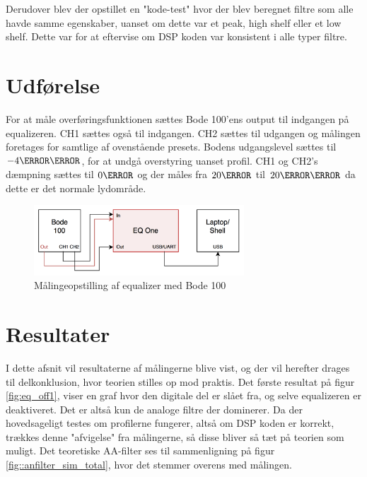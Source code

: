Derudover blev der opstillet en "kode-test" hvor der blev beregnet filtre som alle havde samme egenskaber, uanset om dette var et peak, high shelf eller et low shelf. Dette var for at eftervise om DSP koden var konsistent i alle typer filtre. \\

\section{Udførelse}
For at måle overføringsfunktionen sættes Bode 100'ens output til indgangen på equalizeren. CH1 sættes også til indgangen. CH2 sættes til udgangen og målingen foretages for samtlige af ovenstående presets. Bodens udgangslevel sættes til $-4\decibel\milli$, for at undgå overstyring uanset profil. CH1 og CH2's dæmpning sættes til $0\decibel$ og der måles fra $20\hertz$ til $20\kilo\hertz$ da dette er det normale lydområde.\\


\begin{figure}[h!]\label{fig:bode_setup}
	\centering
	\includegraphics[width=0.7\textwidth]{billeder/bode_setup}
	\caption{Målingeopstilling af equalizer med Bode 100}
\end{figure}	

\FloatBlock

\section{Resultater}
I dette afsnit vil resultaterne af målingerne blive vist, og der vil herefter drages til delkonklusion, hvor teorien stilles op mod praktis.
Det første resultat på figur \ref{fig:eq_off1}, viser en graf hvor den digitale del er slået fra, og selve equalizeren er deaktiveret. Det er altså kun de analoge filtre der dominerer. Da der hovedsageligt testes om profilerne fungerer, altså om DSP koden er korrekt, trækkes denne "afvigelse" fra målingerne, så disse bliver så tæt på teorien som muligt. Det teoretiske AA-filter ses til sammenligning på figur \ref{fig::anfilter_sim_total}, hvor det stemmer overens med målingen.

